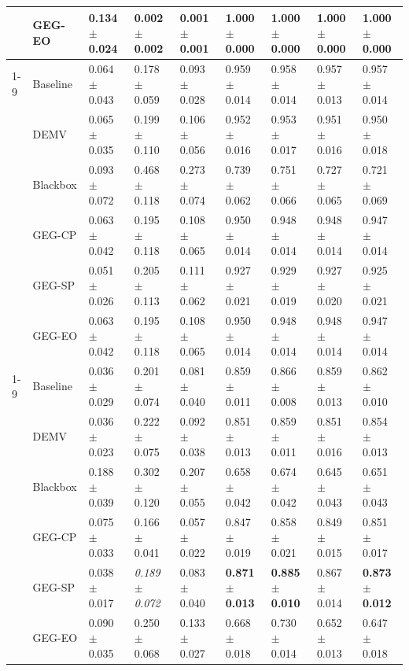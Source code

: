\begin{table}
\begin{tabular}{lllllllll}
 & GEG-EO & 0.134 $\pm$ 0.024 & \textbf{0.002 $\pm$ 0.002} & \textbf{0.001 $\pm$ 0.001} & \textbf{1.000 $\pm$ 0.000} & \textbf{1.000 $\pm$ 0.000} & \textbf{1.000 $\pm$ 0.000} & \textbf{1.000 $\pm$ 0.000} \\
\cline{1-9}
\multirow[t]{6}{*}{obesity} & Baseline & 0.064 $\pm$ 0.043 & 0.178 $\pm$ 0.059 & 0.093 $\pm$ 0.028 & 0.959 $\pm$ 0.014 & 0.958 $\pm$ 0.014 & 0.957 $\pm$ 0.013 & 0.957 $\pm$ 0.014 \\
 & DEMV & 0.065 $\pm$ 0.035 & 0.199 $\pm$ 0.110 & 0.106 $\pm$ 0.056 & 0.952 $\pm$ 0.016 & 0.953 $\pm$ 0.017 & 0.951 $\pm$ 0.016 & 0.950 $\pm$ 0.018 \\
 & Blackbox & 0.093 $\pm$ 0.072 & 0.468 $\pm$ 0.118 & 0.273 $\pm$ 0.074 & 0.739 $\pm$ 0.062 & 0.751 $\pm$ 0.066 & 0.727 $\pm$ 0.065 & 0.721 $\pm$ 0.069 \\
 & GEG-CP & 0.063 $\pm$ 0.042 & 0.195 $\pm$ 0.118 & 0.108 $\pm$ 0.065 & 0.950 $\pm$ 0.014 & 0.948 $\pm$ 0.014 & 0.948 $\pm$ 0.014 & 0.947 $\pm$ 0.014 \\
 & GEG-SP & 0.051 $\pm$ 0.026 & 0.205 $\pm$ 0.113 & 0.111 $\pm$ 0.062 & 0.927 $\pm$ 0.021 & 0.929 $\pm$ 0.019 & 0.927 $\pm$ 0.020 & 0.925 $\pm$ 0.021 \\
 & GEG-EO & 0.063 $\pm$ 0.042 & 0.195 $\pm$ 0.118 & 0.108 $\pm$ 0.065 & 0.950 $\pm$ 0.014 & 0.948 $\pm$ 0.014 & 0.948 $\pm$ 0.014 & 0.947 $\pm$ 0.014 \\
\cline{1-9}
\multirow[t]{6}{*}{park} & Baseline & 0.036 $\pm$ 0.029 & 0.201 $\pm$ 0.074 & 0.081 $\pm$ 0.040 & 0.859 $\pm$ 0.011 & 0.866 $\pm$ 0.008 & 0.859 $\pm$ 0.013 & 0.862 $\pm$ 0.010 \\
 & DEMV & 0.036 $\pm$ 0.023 & 0.222 $\pm$ 0.075 & 0.092 $\pm$ 0.038 & 0.851 $\pm$ 0.013 & 0.859 $\pm$ 0.011 & 0.851 $\pm$ 0.016 & 0.854 $\pm$ 0.013 \\
 & Blackbox & 0.188 $\pm$ 0.039 & 0.302 $\pm$ 0.120 & 0.207 $\pm$ 0.055 & 0.658 $\pm$ 0.042 & 0.674 $\pm$ 0.042 & 0.645 $\pm$ 0.043 & 0.651 $\pm$ 0.043 \\
 & GEG-CP & 0.075 $\pm$ 0.033 & 0.166 $\pm$ 0.041 & 0.057 $\pm$ 0.022 & 0.847 $\pm$ 0.019 & 0.858 $\pm$ 0.021 & 0.849 $\pm$ 0.015 & 0.851 $\pm$ 0.017 \\
 & GEG-SP & 0.038 $\pm$ 0.017 & \textit{0.189 $\pm$ 0.072} & 0.083 $\pm$ 0.040 & \textbf{0.871 $\pm$ 0.013} & \textbf{0.885 $\pm$ 0.010} & 0.867 $\pm$ 0.014 & \textbf{0.873 $\pm$ 0.012} \\
 & GEG-EO & 0.090 $\pm$ 0.035 & 0.250 $\pm$ 0.068 & 0.133 $\pm$ 0.027 & 0.668 $\pm$ 0.018 & 0.730 $\pm$ 0.014 & 0.652 $\pm$ 0.013 & 0.647 $\pm$ 0.018 \\

\end{tabular}
\end{table}
